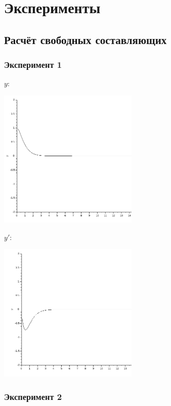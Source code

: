 \documentclass[12pt, a4paper] {ncc}
\begin{document}
\section{Эксперименты}

\subsection{Расчёт свободных составляющих}

\subsubsection{Эксперимент 1}

$y$:
\begin{center}
\includegraphics[width=0.5\textwidth]{1y}
\end{center}

$y'$:
\begin{center}
\includegraphics[width=0.5\textwidth]{1y1}
\end{center}

\subsubsection{Эксперимент 2}
\end{document}
